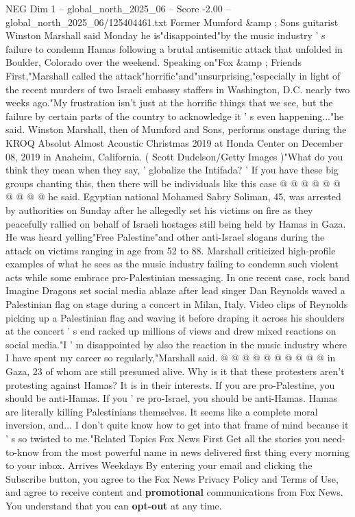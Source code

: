 \begin{textsample}{NEG Dim 1 – global\_north\_2025\_06 – Score -2.00 – global\_north\_2025\_06/125404461.txt}  \label{ex:f1_neg_139}
Former Mumford \&amp ; Sons guitarist Winston Marshall said Monday he is"disappointed"by the music industry ' s failure to condemn Hamas following a brutal antisemitic attack that unfolded in Boulder, Colorado over the weekend.
Speaking on"Fox \&amp ; Friends First,"Marshall called the attack"horrific"and"unsurprising,"especially in light of the recent murders of two Israeli embassy staffers in Washington, D.C. nearly two weeks ago."My frustration isn't just at the horrific things that we see, but the failure by certain parts of the country to acknowledge it ' s even happening..."he said.
Winston Marshall, then of Mumford and Sons, performs onstage during the KROQ Absolut Almost Acoustic Christmas 2019 at Honda Center on December 08, 2019 in Anaheim, California. ( Scott Dudelson/Getty Images )"What do you think they mean when they say, ' globalize the Intifada? ' If you have these big groups chanting this, then there will be individuals like this case @ @ @ @ @ @ @ @ @ @ he said.
Egyptian national Mohamed Sabry Soliman, 45, was arrested by authorities on Sunday after he allegedly set his victims on fire as they peacefully rallied on behalf of Israeli hostages still being held by Hamas in Gaza.
He was heard yelling"Free Palestine"and other anti-Israel slogans during the attack on victims ranging in age from 52 to 88.
Marshall criticized high-profile examples of what he sees as the music industry failing to condemn such violent acts while some embrace pro-Palestinian messaging.
In one recent case, rock band Imagine Dragons set social media ablaze after lead singer Dan Reynolds waved a Palestinian flag on stage during a concert in Milan, Italy.
Video clips of Reynolds picking up a Palestinian flag and waving it before draping it across his shoulders at the concert ' s end racked up millions of views and drew mixed reactions on social media."I ' m disappointed by also the reaction in the music industry where I have spent my career so regularly,"Marshall said. @ @ @ @ @ @ @ @ @ @ in Gaza, 23 of whom are still presumed alive.
Why is it that these protesters aren't protesting against Hamas?
It is in their interests.
If you are pro-Palestine, you should be anti-Hamas.
If you ' re pro-Israel, you should be anti-Hamas.
Hamas are literally killing Palestinians themselves.
It seems like a complete moral inversion, and...
I don't quite know how to get into that frame of mind because it ' s so twisted to me."Related Topics Fox News First Get all the stories you need-to-know from the most powerful name in news delivered first thing every morning to your inbox.
Arrives Weekdays By entering your email and clicking the Subscribe button, you agree to the Fox News Privacy Policy and Terms of Use, and agree to receive content and \textbf{promotional} communications from Fox News.
You understand that you can \textbf{opt-out} at any time.

\end{textsample}
